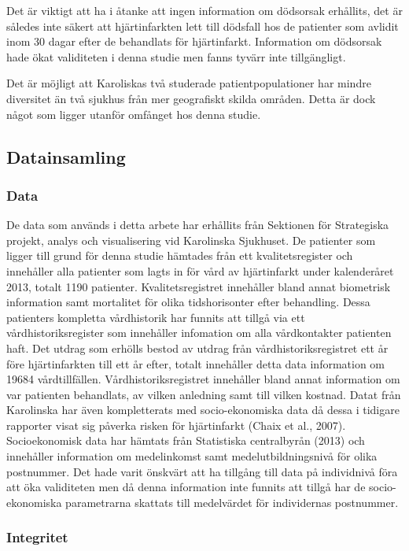 Det är viktigt att ha i åtanke att ingen information om dödsorsak erhållits, det är således inte säkert att hjärtinfarkten lett till dödsfall hos de patienter som avlidit inom 30 dagar efter de behandlats för hjärtinfarkt. Information om dödsorsak hade ökat validiteten i denna studie men fanns tyvärr inte tillgängligt.

Det är möjligt att Karoliskas två studerade patientpopulationer har mindre diversitet än två sjukhus från mer geografiskt skilda områden. Detta är dock något som ligger utanför omfånget hos denna studie.

\subsection{Datainsamling}

\subsubsection{Data}

De data som används i detta arbete har erhållits från Sektionen för Strategiska projekt, analys och visualisering vid Karolinska Sjukhuset. De patienter som ligger till grund för denna studie hämtades från ett kvalitetsregister och innehåller alla patienter som lagts in för vård av hjärtinfarkt under kalenderåret 2013, totalt 1190 patienter. Kvalitetsregistret innehåller bland annat biometrisk information samt mortalitet för olika tidshorisonter efter behandling. Dessa patienters kompletta vårdhistorik har funnits att tillgå via ett vårdhistoriksregister som innehåller infomation om alla vårdkontakter patienten haft. Det utdrag som erhölls bestod av utdrag från vårdhistoriksregistret ett år före hjärtinfarkten till ett år efter, totalt innehåller detta data information om 19684 vårdtillfällen. Vårdhistoriksregistret innehåller bland annat information om var patienten behandlats, av vilken anledning samt till vilken kostnad. Datat från Karolinska har även kompletterats med socio-ekonomiska data då dessa i tidigare rapporter visat sig påverka risken för hjärtinfarkt (Chaix et al., 2007). Socioekonomisk data har hämtats från Statistiska centralbyrån (2013) och innehåller information om medelinkomst samt medelutbildningsnivå för olika postnummer. Det hade varit önskvärt att ha tillgång till data på individnivå föra att öka validiteten men då denna information inte funnits att tillgå har de socio-ekonomiska parametrarna skattats till medelvärdet för individernas postnummer.

\subsubsection{Integritet}

